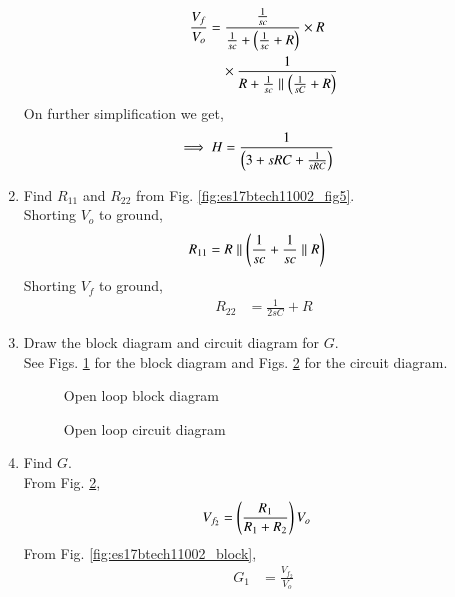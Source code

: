 \begin{enumerate}[label=\arabic*.,ref=\theenumi]
\begin{align}
\frac{V_{f}}{V_{o}} &=\frac{\frac{1}{sc}}{\frac{1}{sc} +  \left(\frac{1}{sc}+R\right)}\times R\\\
&\quad \times  \frac{1}{R + \frac{1}{sc} \parallel \left(\frac{1}{sC}+R\right)}
\end{align}
On further simplification we get,
\begin{align}
\implies H &= \frac{1}{\left(3+sRC +\frac{1}{sRC}\right)}
\label{eq:es17btech11002_H}
\end{align}
%
\item Find $R_{11}$ and $R_{22}$ from Fig. \ref{fig:es17btech11002_fig5}. 
\\
\solution Shorting  $V_{o}$ to ground,
\begin{align}
R_{11} &= R\parallel \left(\frac{1}{sc}+ \frac{1}{sc}\parallel R\right) 
\label{eq:es17btech11002_6}
\end{align}
Shorting $V_{f}$ to ground,
\begin{align}
R_{22} &= \frac{1}{2sC} + R  
\end{align}
%
\item Draw the block diagram and circuit diagram for $G$.\\
\solution See Figs. \ref{fig:es17btech11002_fig6} for the block diagram  and Figs. \ref{fig:es17btech11002_fig7} for the circuit diagram.
\numberwithin{figure}{enumi}
\renewcommand{\thefigure}{\theenumi.\arabic{figure}}
%
\begin{figure}[!ht]
	\begin{center}
		\resizebox{\columnwidth}{!}{}
	\end{center}
\caption{Open loop block diagram}
\label{fig:es17btech11002_fig6}
\end{figure}
%
\begin{figure}[!ht]
	\begin{center}
		\resizebox{\columnwidth}{!}{}
	\end{center}
\caption{Open loop circuit diagram}
\label{fig:es17btech11002_fig7}
\end{figure}
\renewcommand{\thefigure}{\theenumi}
%
\item Find $G$.
\\
\solution From Fig. \ref{fig:es17btech11002_fig7},
\begin{align}
V_{f_{2}} &= \left(\frac{R_{1}}{R_{1} + R_{2}}\right)V_{o}
\end{align}
From Fig. \ref{fig:es17btech11002_block},
%
\begin{align}
G_{1} &= \frac{V_{f_{2}}}{V_{o}}
\end{align}


\end{enumerate}
